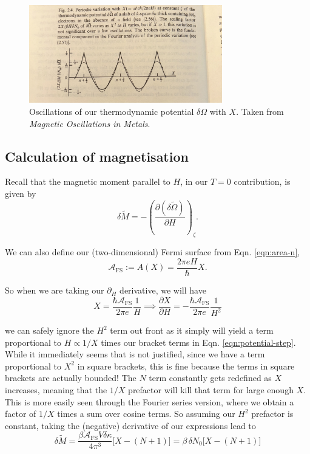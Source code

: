 \documentclass[12pt]{revtex4-2}
\begin{document}
\begin{figure}[tb]
\centering
\includegraphics[width=0.75\textwidth]{figures/oscillations_free_energy.jpg}
\caption{Oscillations of our thermodynamic potential $\delta\Omega$ with $X$.  Taken from \textit{Magnetic Oscillations in Metals}.}
\label{fig:oscillations-energy}
\end{figure}

\subsection{Calculation of magnetisation}

Recall that the magnetic moment parallel to $H$, in our $T=0$ contribution, is given by
\begin{equation}
    \delta \tilde{M} = -\left( \frac{\partial(\delta\tilde{\Omega})}{\partial H} \right)_\zeta.
\end{equation}

We can also define our (two-dimensional) Fermi surface from Eqn. \ref{eqn:area-n}, 
\begin{equation}\label{eqn:fermi-surface-area}
    \mathcal{A}_\text{FS} := A(X) = \frac{2\pi eH}{\hbar}X.
\end{equation}

So when we are taking our $\partial_H$ derivative, we will have
\begin{equation}
    X = \frac{\hbar\mathcal{A}_\text{FS}}{2\pi e}\frac{1}{H} \implies \frac{\partial X}{\partial H} = -\frac{\hbar\mathcal{A}_\text{FS}}{2\pi e} \frac{1}{H^2}
\end{equation}

we can safely ignore the $H^2$ term out front as it simply will yield a term proportional to $H \propto 1/X$ times our bracket terms in Eqn. \ref{eqn:potential-step}.  While it immediately seems that is not justified, since we have a term proportional to $X^2$ in square brackets, this is fine because the terms in square brackets are actually bounded!  The $N$ term constantly gets redefined as $X$ increases, meaning that the $1/X$ prefactor will kill that term for large enough $X$.  This is more easily seen through the Fourier series version, where we obtain a factor of $1/X$ times a sum over cosine terms.  So assuming our $H^2$ prefactor is constant, taking the (negative) derivative of our expressions lead to
\begin{equation}
    \boxed{ \delta \tilde{M} = \frac{\beta\mathcal{A}_\text{FS}V\delta\kappa}{4\pi^3} \big[ X - (N+1) \big] = \beta \, \delta N_0\big[ X - (N+1) \big]}
\end{equation}
\end{document}
